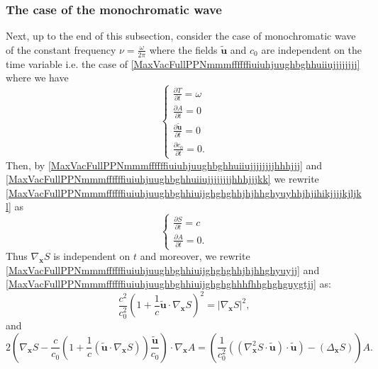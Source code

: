\documentclass{article}
\theoremstyle{definition}
\theoremstyle{remark}
\renewcommand{\vec}[1]{\mathbf{#1}}
\newcommand{\er}{\eqref}
\newcommand{\er}{\eqref}
\begin{document}
\subsubsection{The case of the monochromatic wave}\label{mnGO}
Next, up to the end of this subsection, consider the case of
monochromatic wave of the constant frequency
$\nu=\frac{\omega}{2\pi}$ where the fields $\vec {\tilde u}$ and
$c_0$ are independent on the time variable i.e. the case of
\er{MaxVacFullPPNmmmffffffiuiuhjuughbghhuiiujjjjjjjj} where we have
\begin{equation}\label{MaxVacFullPPNmmmffffffiuiuhjuughbghhiuijghghghhjhjhhghyuyhhjhjihikjjjjkjljkl}
\begin{cases}
\frac{\partial T}{\partial t}=\omega\\
\frac{\partial A}{\partial t}=0\\
\frac{\partial \vec {\tilde u}}{\partial t}=0\\
\frac{\partial c_0}{\partial t}=0.
\end{cases}
\end{equation}
Then, by \er{MaxVacFullPPNmmmffffffiuiuhjuughbghhuiiujjjjjjjjhhhjjj}
and \er{MaxVacFullPPNmmmffffffiuiuhjuughbghhuiiujjjjjjjjhhhjjjkk} we
rewrite
\er{MaxVacFullPPNmmmffffffiuiuhjuughbghhiuijghghghhjhjhhghyuyhhjhjihikjjjjkjljkl}
as
\begin{equation}\label{MaxVacFullPPNmmmffffffiuiuhjuughbghhiuijghghghhjhjhhghyuyhhjhjihikjjj}
\begin{cases}
\frac{\partial S}{\partial t}=c\\
\frac{\partial A}{\partial t}=0.
\end{cases}
\end{equation}
Thus $\nabla_{\vec x}S$ is independent on $t$ and moreover, we
rewrite
\er{MaxVacFullPPNmmmffffffiuiuhjuughbghhiuijghghghhjhjhhghyuyjj} and
\er{MaxVacFullPPNmmmffffffiuiuhjuughbghhiuijghghghhhfhhghghguygtjj}
as:
\begin{equation}\label{MaxVacFullPPNmmmffffffiuiuhjuughbghhiuijghghghhjhjhhghyuyiyyujj}
\frac{c^2}{c^2_0}\left(1+\frac{1}{c}\vec {\tilde u}\cdot\nabla_\vec
x S\right)^2=\left|\nabla_\vec x S\right|^2,
\end{equation}
and
\begin{equation}\label{MaxVacFullPPNmmmffffffiuiuhjuughbghhiuijghghghhhfhhghghguygtjuuujj}
2\left(\nabla_{\vec x}S-\frac{c}{c_0}\left(1+\frac{1}{c}\left(\vec
{\tilde u}\cdot\nabla_{\vec x}S\right)\right)\frac{\vec {\tilde
u}}{c_0}\right)\cdot\nabla_{\vec
x}A=\left(\frac{1}{c^2_0}\left(\left(\nabla^2_{\vec x}S\cdot\vec
{\tilde u}\right)\cdot\vec {\tilde u}\right)-\left(\Delta_{\vec
x}S\right)\right)A.
\end{equation}
\end{document}
